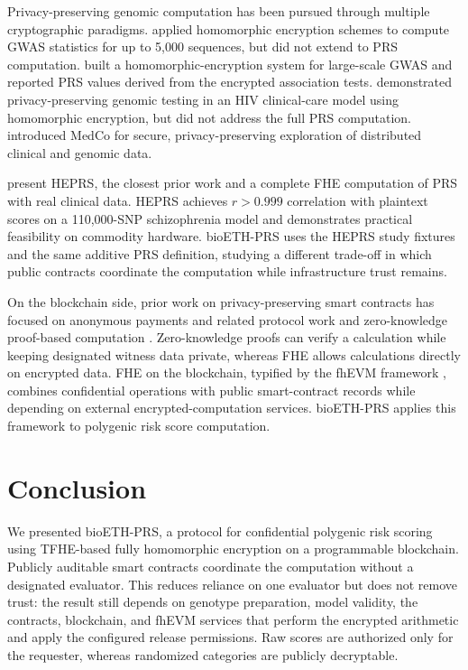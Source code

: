 \documentclass[10pt]{article}
\begin{document}
Privacy-preserving genomic computation has been pursued through multiple
cryptographic paradigms.  \citet{kim2015} applied homomorphic
encryption schemes to compute GWAS statistics for up to 5,000 sequences, but did not
extend to PRS computation.  \citet{blatt2020} built a homomorphic-encryption system for
large-scale GWAS and reported PRS values derived from the encrypted association tests.
\citet{mclaren2016} demonstrated privacy-preserving genomic testing in an HIV
clinical-care model using homomorphic encryption, but did not address the full PRS
computation.  \citet{raisaro2019} introduced MedCo for secure,
privacy-preserving exploration of distributed clinical and genomic data.

\citet{knight2026heprs} present HEPRS, the closest prior work and a complete FHE
computation of PRS with real clinical data.  HEPRS achieves
$r > 0.999$ correlation with plaintext scores on a 110,000-SNP schizophrenia
model and demonstrates practical feasibility on commodity hardware.  bioETH-PRS
uses the HEPRS study fixtures and the same additive PRS definition, studying a
different trade-off in which public contracts coordinate the computation while
infrastructure trust remains.

On the blockchain side, prior work on privacy-preserving smart contracts has
focused on anonymous payments and related protocol work
\citep{sasson2014zerocash,pertsev2019tornado} and
zero-knowledge proof-based computation \citep{ben2018starkware}.  Zero-knowledge proofs
can verify a calculation while keeping designated witness data private, whereas FHE
allows calculations directly on encrypted data.  FHE on the blockchain, typified by the fhEVM
framework \citep{zamafhevm}, combines confidential operations with public smart-contract
records while depending on external encrypted-computation services.  bioETH-PRS applies
this framework to polygenic risk score computation.

\section{Conclusion}
\label{sec:conclusion}

We presented bioETH-PRS, a protocol for confidential polygenic risk
scoring using TFHE-based fully homomorphic encryption on a programmable blockchain.
Publicly auditable smart contracts coordinate the computation without a designated
evaluator.  This reduces reliance on one evaluator but does not
remove trust: the result still depends on genotype preparation, model validity, the
contracts, blockchain, and fhEVM services that perform the encrypted arithmetic and
apply the configured release permissions.  Raw scores are authorized only for the
requester, whereas randomized categories are publicly decryptable.
\end{document}
